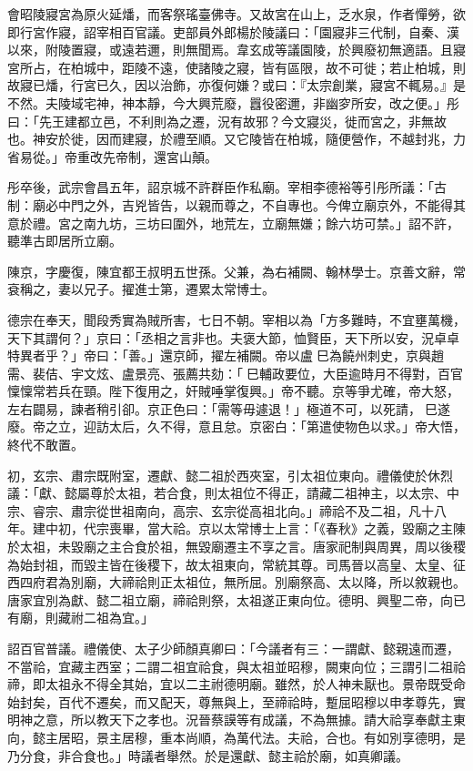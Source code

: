 \begin{pinyinscope}
 會昭陵寢宮為原火延燔，而客祭瑤臺佛寺。又故宮在山上，乏水泉，作者憚勞，欲即行宮作寢，詔宰相百官議。吏部員外郎楊於陵議曰：「園寢非三代制，自秦、漢以來，附陵置寢，或遠若邇，則無聞焉。韋玄成等議園陵，於興廢初無適語。且寢宮所占，在柏城中，距陵不遠，使諸陵之寢，皆有區限，故不可徙；若止柏城，則故寢已燔，行宮已久，因以治飾，亦復何嫌？或曰：『太宗創業，寢宮不輒易。』是不然。夫陵域宅神，神本靜，今大興荒廢，囂役密邇，非幽穸所安，改之便。」彤曰：「先王建都立邑，不利則為之遷，況有故邪？今文寢災，徙而宮之，非無故也。神安於徙，因而建寢，於禮至順。又它陵皆在柏城，隨便營作，不越封兆，力省易從。」帝重改先帝制，還宮山顛。



 彤卒後，武宗會昌五年，詔京城不許群臣作私廟。宰相李德裕等引彤所議：「古制：廟必中門之外，吉兇皆告，以親而尊之，不自專也。今俾立廟京外，不能得其意於禮。宮之南九坊，三坊曰圍外，地荒左，立廟無嫌；餘六坊可禁。」詔不許，聽準古即居所立廟。



 陳京，字慶復，陳宜都王叔明五世孫。父兼，為右補闕、翰林學士。京善文辭，常袞稱之，妻以兄子。擢進士第，遷累太常博士。



 德宗在奉天，聞段秀實為賊所害，七日不朝。宰相以為「方多難時，不宜壅萬機，天下其謂何？」京曰：「丞相之言非也。夫褒大節，恤賢臣，天下所以安，況卓卓特異者乎？」帝曰：「善。」還京師，擢左補闕。帝以盧巳為饒州刺史，京與趙需、裴佶、宇文炫、盧景亮、張薦共劾：「巳輔政要位，大臣逾時月不得對，百官懍懍常若兵在頸。陛下復用之，奸賊唾掌復興。」帝不聽。京等爭尤確，帝大怒，左右闢易，諫者稍引卻。京正色曰：「需等毋遽退！」極道不可，以死請，巳遂廢。帝之立，迎訪太后，久不得，意且怠。京密白：「第遣使物色以求。」帝大悟，終代不敢置。



 初，玄宗、肅宗既附室，遷獻、懿二祖於西夾室，引太祖位東向。禮儀使於休烈議：「獻、懿屬尊於太祖，若合食，則太祖位不得正，請藏二祖神主，以太宗、中宗、睿宗、肅宗從世祖南向，高宗、玄宗從高祖北向。」禘祫不及二祖，凡十八年。建中初，代宗喪畢，當大祫。京以太常博士上言：「《春秋》之義，毀廟之主陳於太祖，未毀廟之主合食於祖，無毀廟遷主不享之言。唐家祀制與周異，周以後稷為始封祖，而毀主皆在後稷下，故太祖東向，常統其尊。司馬晉以高皇、太皇、征西四府君為別廟，大禘祫則正太祖位，無所屈。別廟祭高、太以降，所以敘親也。唐家宜別為獻、懿二祖立廟，禘祫則祭，太祖遂正東向位。德明、興聖二帝，向已有廟，則藏祔二祖為宜。」



 詔百官普議。禮儀使、太子少師顏真卿曰：「今議者有三：一謂獻、懿親遠而遷，不當祫，宜藏主西室；二謂二祖宜祫食，與太祖並昭穆，闕東向位；三謂引二祖祫禘，即太祖永不得全其始，宜以二主祔德明廟。雖然，於人神未厭也。景帝既受命始封矣，百代不遷矣，而又配天，尊無與上，至禘祫時，蹔屈昭穆以申孝尊先，實明神之意，所以教天下之孝也。況晉蔡謨等有成議，不為無據。請大祫享奉獻主東向，懿主居昭，景主居穆，重本尚順，為萬代法。夫祫，合也。有如別享德明，是乃分食，非合食也。」時議者舉然。於是還獻、懿主祫於廟，如真卿議。




\end{pinyinscope}
